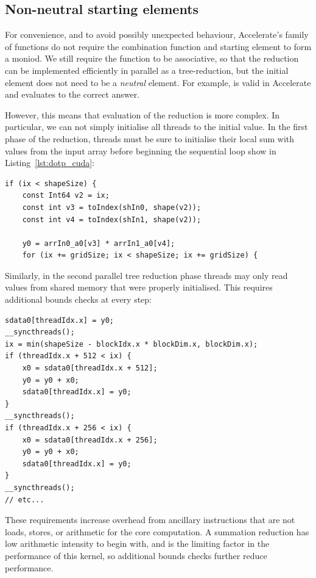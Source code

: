\subsection{Non-neutral starting elements}

For convenience, and to avoid possibly unexpected behaviour, Accelerate's
 family of functions do not require the combination function and
starting element to form a moniod. We still require the function to be
associative, so that the reduction can be implemented efficiently in parallel as
a tree-reduction, but the initial element does not need to be a \emph{neutral}
element. For example,  is valid in
Accelerate and evaluates to the correct answer.

However, this means that evaluation of the reduction is more complex. In
particular, we can not simply initialise all threads to the initial value.
In the first phase of the reduction, threads must be sure to initialise
their local sum  with values from the input array before beginning the
sequential loop show in Listing~\ref{lst:dotp_cuda}:
%
\begin{lstlisting}[style=cuda,firstnumber=12]
if (ix < shapeSize) {
    const Int64 v2 = ix;
    const int v3 = toIndex(shIn0, shape(v2));
    const int v4 = toIndex(shIn1, shape(v2));

    y0 = arrIn0_a0[v3] * arrIn1_a0[v4];
    for (ix += gridSize; ix < shapeSize; ix += gridSize) {
\end{lstlisting}

Similarly, in the second parallel tree reduction phase threads may only read
values from shared memory that were properly initialised. This requires
additional bounds checks at every step:
%
\begin{lstlisting}[style=cuda,firstnumber=27]
sdata0[threadIdx.x] = y0;
__syncthreads();
ix = min(shapeSize - blockIdx.x * blockDim.x, blockDim.x);
if (threadIdx.x + 512 < ix) {
    x0 = sdata0[threadIdx.x + 512];
    y0 = y0 + x0;
    sdata0[threadIdx.x] = y0;
}
__syncthreads();
if (threadIdx.x + 256 < ix) {
    x0 = sdata0[threadIdx.x + 256];
    y0 = y0 + x0;
    sdata0[threadIdx.x] = y0;
}
__syncthreads();
// etc...
\end{lstlisting}

These requirements increase overhead from ancillary instructions that are not
loads, stores, or arithmetic for the core computation. A summation reduction has
low arithmetic intensity to begin with, and is the limiting factor in the
performance of this kernel, so additional bounds checks further reduce
performance.

